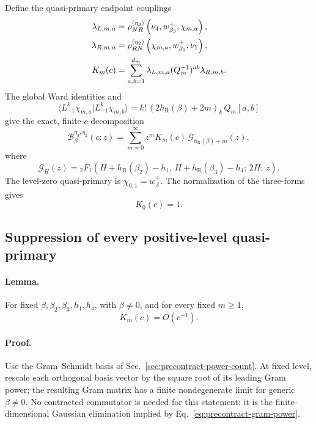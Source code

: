 \documentclass[11pt]{article}
\newcommand{\R}{\mathrm R}
\newcommand{\B}{\mathcal B}
\begin{document}
Define the quasi-primary endpoint couplings
\begin{align}
 \lambda_{L,m,a}
 &=
 \rho_{NR}^{(\eta_3)}
 \left(\nu_4,w_{\beta_3}^+,\chi_{m,a}\right),
 \notag\\
 \lambda_{R,m,a}
 &=
 \rho_{RN}^{(\eta_2)}
 \left(\chi_{m,a},w_{\beta_2}^+,\nu_1\right),
 \notag\\
 K_m(c)
 &=
 \sum_{a,b=1}^{d_m}
 \lambda_{L,m,a}(Q_m^{-1})^{ab}\lambda_{R,m,b}.
 \label{eq:quasiprimary-sewing-coefficient}
\end{align}
The global Ward identities and
\[
 \langle L_{-1}^k\chi_{m,a}|L_{-1}^k\chi_{m,b}\rangle
 =
 k!\,(2h_\R(\beta)+2m)_k\,Q_m[a,b]
\]
give the exact, finite-\(c\) decomposition
\begin{equation}
 \boxed{
 \B_\beta^{\eta_3,\eta_2}(c;z)
 =
 \sum_{m=0}^{\infty}
 z^m K_m(c)\,
 \mathcal G_{h_\R(\beta)+m}(z),}
 \label{eq:exact-global-family-block}
\end{equation}
where
\begin{equation}
 \mathcal G_H(z)
 =
 {}_2F_1\left(
 H+h_\R(\beta_2)-h_1,\,
 H+h_\R(\beta_3)-h_4;\,
 2H;\,z\right).
 \label{eq:global-family-block}
\end{equation}
The level-zero quasi-primary is
\(\chi_{0,1}=w_\beta^+\).  The normalization of the three-forms gives
\begin{equation}
 K_0(c)=1.
 \label{eq:ground-family-coefficient}
\end{equation}

\subsection{Suppression of every positive-level quasi-primary}

\paragraph{Lemma.}
For fixed
\(\beta,\beta_2,\beta_3,h_1,h_4\), with \(\beta\ne0\), and for every
fixed \(m\ge1\),
\begin{equation}
 \boxed{K_m(c)=O(c^{-1}).}
 \label{eq:positive-quasiprimary-suppression}
\end{equation}

\paragraph{Proof.}
Use the Gram--Schmidt basis of
Sec.~\ref{sec:precontract-power-count}.  At fixed level, rescale each
orthogonal basis vector by the square root of its leading Gram power; the
resulting Gram matrix has a finite nondegenerate limit for generic
\(\beta\ne0\).  No contracted commutator is needed for this statement: it
is the finite-dimensional Gaussian elimination implied by
Eq.~\eqref{eq:precontract-gram-power}.
\end{document}

